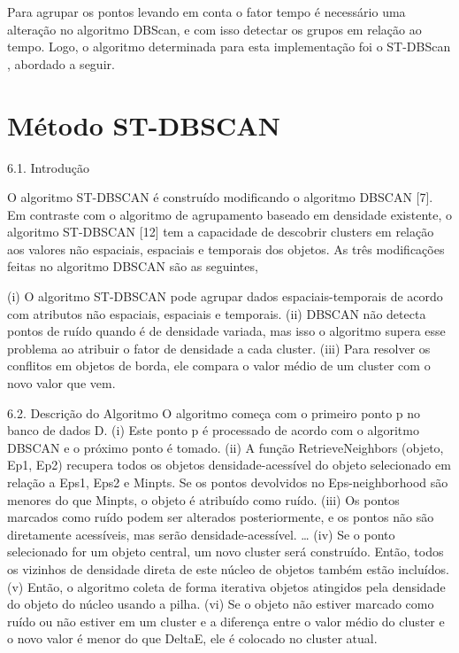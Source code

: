 Para agrupar os pontos levando em conta o fator tempo é necessário uma alteração no algoritmo DBScan, e com isso detectar os grupos em relação ao tempo. Logo, o algoritmo determinada para esta implementação foi o ST-DBScan \cite{Birant2007STDBSCANAA}, abordado a seguir.

\section{Método ST-DBSCAN}
\label{stdbscan}

6.1. Introdução

O algoritmo ST-DBSCAN é construído modificando o algoritmo DBSCAN [7]. Em contraste com o algoritmo de agrupamento baseado em densidade existente, o algoritmo ST-DBSCAN [12] tem a capacidade de descobrir clusters em relação aos valores não espaciais, espaciais e temporais dos objetos. As três modificações feitas no algoritmo DBSCAN são as seguintes,

(i) O algoritmo ST-DBSCAN pode agrupar dados espaciais-temporais de acordo com atributos não espaciais, espaciais e temporais.
(ii) DBSCAN não detecta pontos de ruído quando é de densidade variada, mas isso o algoritmo supera esse problema ao atribuir o fator de densidade a cada cluster.
(iii) Para resolver os conflitos em objetos de borda, ele compara o valor médio de um cluster com o novo valor que vem.

6.2. Descrição do Algoritmo
O algoritmo começa com o primeiro ponto p no banco de dados D.
(i) Este ponto p é processado de acordo com o algoritmo DBSCAN e o próximo ponto é tomado.
(ii) A função RetrieveNeighbors (objeto, Ep1, Ep2) recupera todos os objetos densidade-acessível do objeto selecionado em relação a Eps1, Eps2 e Minpts. Se os pontos devolvidos no Eps-neighborhood são menores do que Minpts, o objeto é atribuído como ruído.
(iii) Os pontos marcados como ruído podem ser alterados posteriormente, e os pontos não são diretamente acessíveis, mas serão densidade-acessível.
…
(iv) Se o ponto selecionado for um objeto central, um novo cluster será construído. Então, todos os vizinhos de densidade direta de este núcleo de objetos também estão incluídos.
(v) Então, o algoritmo coleta de forma iterativa objetos atingidos pela densidade do objeto do núcleo usando a pilha.
(vi) Se o objeto não estiver marcado como ruído ou não estiver em um cluster e a diferença
entre o valor médio do cluster e o novo valor é menor do que DeltaE, ele é colocado no cluster atual.

